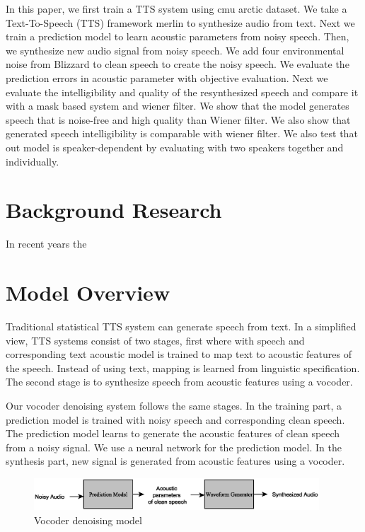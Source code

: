 \documentclass{article}
\begin{document}
In this paper, we first train a TTS system using cmu arctic dataset. We take a Text-To-Speech (TTS) framework merlin \cite{wu2016merlin} to synthesize audio from text. Next we train a prediction model to learn acoustic parameters from noisy speech. Then, we synthesize new audio signal from noisy speech. We add four environmental noise from Blizzard \cite{KingAndKaraiskos2013} to clean speech to create the noisy speech. We evaluate the prediction errors in acoustic parameter with objective evaluation. Next we evaluate the intelligibility and quality  of the resynthesized speech  and compare it with a mask based system and wiener filter. We show that the model generates speech that is noise-free and high quality than Wiener filter. We also show that generated speech intelligibility is comparable with wiener filter. We also test that out model is speaker-dependent by evaluating with two speakers together and individually.



\section{Background Research}
\label{sec:back}
In recent years the

\section{Model Overview }
\label{sec:mod_ovr}
Traditional statistical TTS system can generate speech from text. In a simplified view, TTS systems consist of two stages, first where with speech and corresponding text acoustic model is trained to map text to acoustic features of the speech. Instead of using text, mapping is learned from linguistic specification.  The second stage is to synthesize speech from acoustic features using a vocoder.

Our vocoder denoising system follows the same stages. In the training part, a prediction model is trained with noisy speech and corresponding clean speech. The prediction model learns to generate the acoustic features of clean speech from a noisy signal. We use a neural network for the prediction model. In the synthesis part, new signal is generated from acoustic features using a vocoder. 

\begin{figure}[htb]
\begin{minipage}[b]{0.9\linewidth}
  \centering
  \centerline{\includegraphics[width=0.95\textwidth]{model.eps}}
\end{minipage}
\caption{Vocoder denoising model}
\label{fig:res}
\end{figure}
\end{document}

